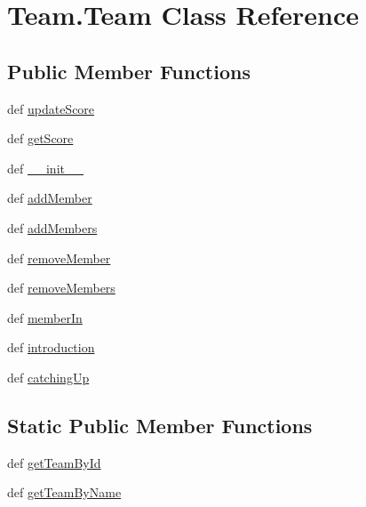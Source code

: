 \hypertarget{classTeam_1_1Team}{\section{\-Team.\-Team \-Class \-Reference}
\label{classTeam_1_1Team}
}
\subsection*{\-Public \-Member \-Functions}
\begin{DoxyCompactItemize}
\item 
def \hyperlink{classTeam_1_1Team_a9a7d47b8c92036911b8de7def308c107}{update\-Score}
\item 
def \hyperlink{classTeam_1_1Team_a3e23b02741f89cf2a530522a340e21ab}{get\-Score}
\item 
def \hyperlink{classTeam_1_1Team_a6ff7995fb1950ca7246a09809982ea46}{\-\_\-\-\_\-init\-\_\-\-\_\-}
\item 
def \hyperlink{classTeam_1_1Team_a0b4fbdff85a79a9345d99958c5de87b0}{add\-Member}
\item 
def \hyperlink{classTeam_1_1Team_a1f9b5f26f806bed2ae6e35554719d4ff}{add\-Members}
\item 
def \hyperlink{classTeam_1_1Team_a37790104488b3c01a635635226cee5b6}{remove\-Member}
\item 
def \hyperlink{classTeam_1_1Team_a05a50256efe52eba988fbddf4a243e4f}{remove\-Members}
\item 
def \hyperlink{classTeam_1_1Team_a5bba620642e81d565a8af2bed2f30b9e}{member\-In}
\item 
def \hyperlink{classTeam_1_1Team_a276c4d4180f64c3cb08b8010880a9b9d}{introduction}
\item 
def \hyperlink{classTeam_1_1Team_aeebecaa4f6aa2e6f5b82ee47a9979261}{catching\-Up}
\end{DoxyCompactItemize}
\subsection*{\-Static \-Public \-Member \-Functions}
\begin{DoxyCompactItemize}
\item 
def \hyperlink{classTeam_1_1Team_a7e8c2ab43819f9811dc6c7a562fbc1a3}{get\-Team\-By\-Id}
\item 
def \hyperlink{classTeam_1_1Team_ad31e302fa77d88bf51a248bd01b2ae8c}{get\-Team\-By\-Name}
\end{DoxyCompactItemize}
